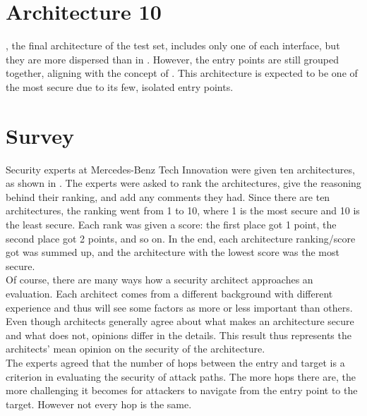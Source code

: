 \section{Architecture 10}
\label{subsec:arch10}

, the final architecture of the test set, includes only one of each interface, 
but they are more dispersed than in . 
However, the entry points are still grouped together, aligning with the concept of . 
This architecture is expected to be one of the most secure due to its few, isolated entry points.

\section{Survey}
\label{sec:survey}

Security experts at Mercedes-Benz Tech Innovation were given ten architectures, as shown in .
The experts were asked to rank the architectures, give the reasoning behind their ranking, and add any comments they had.
Since there are ten architectures, the ranking went from 1 to 10, where 1 is the most secure and 10 is the least secure.
Each rank was given a score: the first place got 1 point, the second place got 2 points, and so on.
In the end, each architecture ranking/score got was summed up, and the architecture with the lowest score was the most secure.\\

Of course, there are many ways how a security architect approaches an evaluation.
Each architect comes from a different background with different experience and thus will see some factors as more or less important than others.
Even though architects generally agree about what makes an architecture secure and what does not, opinions differ in the details.
This result thus represents the architects' mean opinion on the security of the architecture.\\

The experts agreed that the number of hops between the entry and target is a criterion in evaluating the security of attack paths. 
The more hops there are, the more challenging it becomes for attackers to navigate from the entry point to the target. However not every hop is the same.\\

